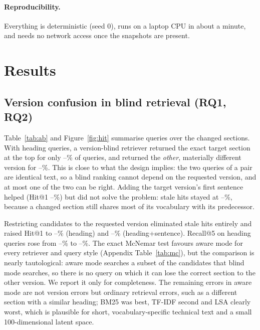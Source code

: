 \documentclass[11pt,a4paper]{article}
\begin{document}
\paragraph{Reproducibility.}
Everything is deterministic (seed 0), runs on a laptop CPU in about a minute, and needs no network access once the snapshots are present.

\section{Results}
\label{sec:results}
\subsection{Version confusion in blind retrieval (RQ1, RQ2)}
\label{sec:res-a}
Table~\ref{tab:ab} and Figure~\ref{fig:hit} summarise \NQueriesChanged{} queries over the \NChanged{} changed sections. With heading queries, a version-blind retriever returned the exact target
section at the top for only \HitBlindHMin--\HitBlindHMax\% of queries, and returned the \emph{other}, materially different version for \StaleHMin--\StaleHMax\%. This is close to what the design implies: the two
queries of a pair are identical text, so a blind ranking cannot depend on the requested version, and at most one of the two can be right. Adding the target version's first sentence helped
(Hit@1 \HitBlindFMin--\HitBlindFMax\%) but did not solve the problem: stale hits stayed at \StaleFMin--\StaleFMax\%, because a changed section still shares most of its vocabulary with its predecessor.

Restricting candidates to the requested version eliminated stale hits entirely and raised Hit@1 to \HitAwareHMin--\HitAwareHMax\% (heading) and \HitAwareFMin--\HitAwareFMax\% (heading+sentence). Recall@5 on heading queries
rose from \RecBlindMin--\RecBlindMax\% to \RecAwareMin--\RecAwareMax\%. The exact McNemar test favours aware mode for every retriever and query style (Appendix Table~\ref{tab:mc}), but the comparison is nearly tautological: aware
mode searches a subset of the candidates that blind mode searches, so there is no query on which it can lose the correct section to the other version. We report it only for completeness.
The remaining errors in aware mode are not version errors but ordinary retrieval errors, such as a different section with a similar heading; BM25 was best, TF-IDF second and LSA clearly worst, which is
plausible for short, vocabulary-specific technical text and a small 100-dimensional latent space.
\end{document}
